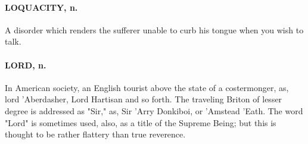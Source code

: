 \documentclass[11pt]{article}
\begin{document}
\paragraph{LOQUACITY, n.}  A disorder which renders the sufferer unable to curb
his tongue when you wish to talk.

\paragraph{LORD, n.}  In American society, an English tourist above the state of a
costermonger, as, lord 'Aberdasher, Lord Hartisan and so forth.  The
traveling Briton of lesser degree is addressed as "Sir," as, Sir 'Arry
Donkiboi, or 'Amstead 'Eath.  The word "Lord" is sometimes used, also,
as a title of the Supreme Being; but this is thought to be rather
flattery than true reverence.
\end{document}
